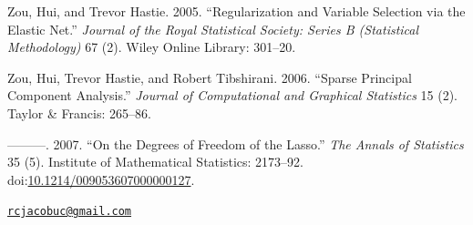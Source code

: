 \hypertarget{ref-zou2005regularization}{}
Zou, Hui, and Trevor Hastie. 2005. ``Regularization and Variable
Selection via the Elastic Net.'' \emph{Journal of the Royal Statistical
Society: Series B (Statistical Methodology)} 67 (2). Wiley Online
Library: 301--20.

\hypertarget{ref-zou2006sparse}{}
Zou, Hui, Trevor Hastie, and Robert Tibshirani. 2006. ``Sparse Principal
Component Analysis.'' \emph{Journal of Computational and Graphical
Statistics} 15 (2). Taylor \& Francis: 265--86.

\hypertarget{ref-Zou2007}{}
---------. 2007. ``On the Degrees of Freedom of the Lasso.'' \emph{The
Annals of Statistics} 35 (5). Institute of Mathematical Statistics:
2173--92.
doi:\href{https://doi.org/10.1214/009053607000000127}{10.1214/009053607000000127}.

\address{%
Ross Jacobucci\\
University of Notre Dame\\
118 Haggar Hall, Notre Dame, IN 46556\\
}
\href{mailto:rcjacobuc@gmail.com}{\nolinkurl{rcjacobuc@gmail.com}}

